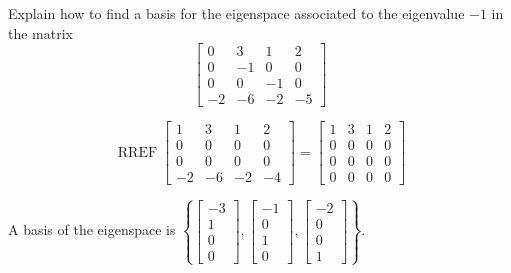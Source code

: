 
\begin{exerciseStatement}


Explain how to find a basis for the eigenspace associated to the eigenvalue \( -1 \) in the matrix \[ \left[\begin{array}{cccc}
0 & 3 & 1 & 2 \\
0 & -1 & 0 & 0 \\
0 & 0 & -1 & 0 \\
-2 & -6 & -2 & -5
\end{array}\right] \]


\end{exerciseStatement}
    
\begin{exerciseAnswer} 


\[\operatorname{RREF} \left[\begin{array}{cccc}
1 & 3 & 1 & 2 \\
0 & 0 & 0 & 0 \\
0 & 0 & 0 & 0 \\
-2 & -6 & -2 & -4
\end{array}\right] = \left[\begin{array}{cccc}
1 & 3 & 1 & 2 \\
0 & 0 & 0 & 0 \\
0 & 0 & 0 & 0 \\
0 & 0 & 0 & 0
\end{array}\right] \]



A basis of the eigenspace is \( \left\{ \left[\begin{array}{c}
-3 \\
1 \\
0 \\
0
\end{array}\right] , \left[\begin{array}{c}
-1 \\
0 \\
1 \\
0
\end{array}\right] , \left[\begin{array}{c}
-2 \\
0 \\
0 \\
1
\end{array}\right] \right\} \).


\end{exerciseAnswer}
    
